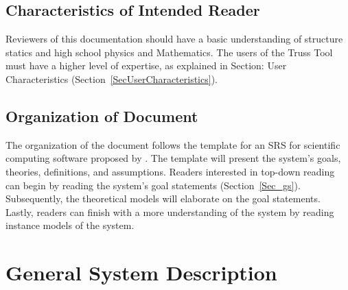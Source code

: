 \documentclass[12pt]{article}
\begin{document}
\subsection{Characteristics of Intended Reader} \label{sec_IntendedReader}
Reviewers of this documentation should have a basic understanding of structure statics and high school physics and Mathematics. The users of the Truss Tool must have a higher level of expertise, as explained in Section: User Characteristics (Section~\ref{SecUserCharacteristics}). 


\subsection{Organization of Document}
The organization of the document follows the template for an SRS for scientific computing software proposed by \citep{SmithandLai2005}. The template will present the system's goals, theories, definitions, and assumptions. Readers interested in top-down reading can begin by reading the system's goal statements (Section~\ref{Sec_gs}). Subsequently, the theoretical models will elaborate on the goal statements. Lastly, readers can finish with a more  understanding of the system by reading instance models of the system.

\section{General System Description}
\end{document}
